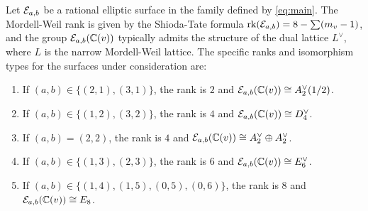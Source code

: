 \documentclass[11pt]{amsart}
\begin{document}
\begin{thm}
	\label{thm:lattice_structure}
	Let ${\mathcal E}_{a,b}$ be a rational elliptic surface in the family defined by \eqref{eq:main}. The Mordell-Weil rank is given by the Shioda-Tate formula ${\text{rk}}({\mathcal E}_{a,b}) = 8 - \sum (m_v - 1)$, and the group ${\mathcal E}_{a,b}({\mathbb C}(v))$ typically admits the structure of the dual lattice $L^\vee$, where $L$ is the narrow Mordell-Weil lattice. The specific ranks and isomorphism types for the surfaces under consideration are:
	\begin{enumerate}
		\item If $(a,b) \in \{(2,1), (3,1)\}$, the rank is $2$ and ${\mathcal E}_{a,b}({\mathbb C}(v)) \cong A_2^\vee(1/2)$.
		\item If $(a,b) \in \{(1,2), (3,2)\}$, the rank is $4$ and ${\mathcal E}_{a,b}({\mathbb C}(v)) \cong D_4^\vee$.
		\item If $(a,b) = (2,2)$, the rank is $4$ and ${\mathcal E}_{a,b}({\mathbb C}(v)) \cong A_2^\vee \oplus A_2^\vee$.
		\item If $(a,b) \in \{(1,3), (2,3)\}$, the rank is $6$ and ${\mathcal E}_{a,b}({\mathbb C}(v)) \cong E_6^\vee$.
		\item If $(a,b) \in \{(1,4), (1,5), (0,5), (0,6)\}$, the rank is $8$ and ${\mathcal E}_{a,b}({\mathbb C}(v)) \cong E_8$.
	\end{enumerate}
\end{thm}
\end{document}
